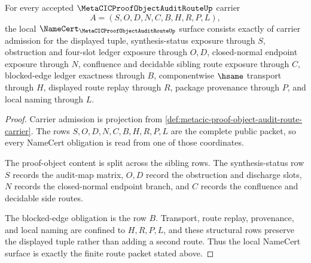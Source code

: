 \begin{theorem}
\label{thm:metacic-proof-object-audit-route-namecert-obligations}
For every accepted $\MetaCICProofObjectAuditRouteUp$ carrier
$$
A=(S,O,D,N,C,B,H,R,P,L),
$$
the local $\NameCert_{\MetaCICProofObjectAuditRouteUp}$ surface consists exactly of carrier admission for the displayed tuple, synthesis-status exposure through $S$, obstruction and four-slot ledger exposure through $O,D$, closed-normal endpoint exposure through $N$, confluence and decidable sibling route exposure through $C$, blocked-edge ledger exactness through $B$, componentwise $\hsame$ transport through $H$, displayed route replay through $R$, package provenance through $P$, and local naming through $L$.
\end{theorem}
\begin{proof}
Carrier admission is projection from \autoref{def:metacic-proof-object-audit-route-carrier}. The rows $S,O,D,N,C,B,H,R,P,L$ are the complete public packet, so every NameCert obligation is read from one of those coordinates.

The proof-object content is split across the sibling rows. The synthesis-status row $S$ records the audit-map matrix, $O,D$ record the obstruction and discharge slots, $N$ records the closed-normal endpoint branch, and $C$ records the confluence and decidable side routes.

The blocked-edge obligation is the row $B$. Transport, route replay, provenance, and local naming are confined to $H,R,P,L$, and these structural rows preserve the displayed tuple rather than adding a second route. Thus the local NameCert surface is exactly the finite route packet stated above.
\end{proof}

